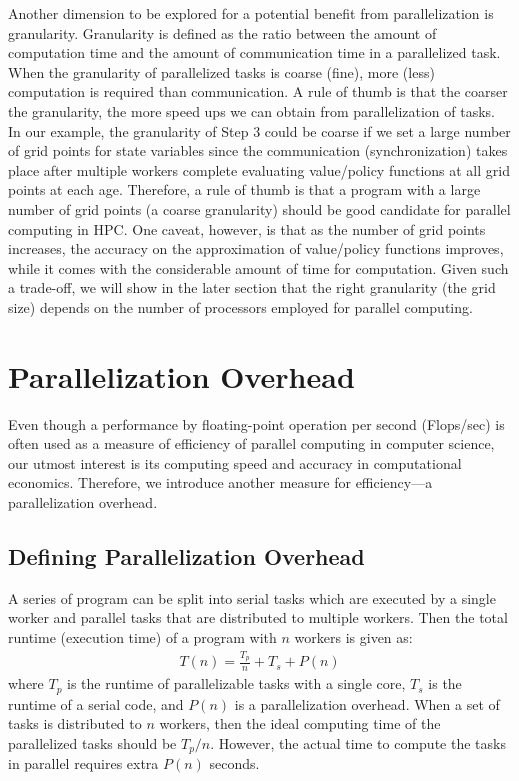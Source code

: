 \documentclass[12pt]{article}
\begin{document}
Another dimension to be explored for a potential benefit from parallelization is granularity. Granularity is defined as the ratio between the amount of computation time and the amount of communication time in a parallelized task. When the granularity of parallelized tasks is coarse (fine), more (less) computation is required than communication. A rule of thumb is that the coarser the granularity, the more speed ups we can obtain from parallelization of tasks. In our example, the granularity of Step 3 could be coarse if we set a large number of grid points for state variables since the communication (synchronization) takes place after multiple workers complete evaluating value/policy functions at all grid points at each age. Therefore, a rule of thumb is that a program with a large number of grid points (a coarse granularity) should be good candidate for parallel computing in HPC. One caveat, however, is that as the number of grid points increases, the accuracy on the approximation of value/policy functions improves, while it comes with the considerable amount of time for computation. Given such a trade-off, we will show in the later section that the right granularity (the grid size) depends on the number of processors employed for parallel computing. 





\section{Parallelization Overhead}
Even though a performance by floating-point operation per second (Flops/sec) is often used as a measure of efficiency of parallel computing in computer science, our utmost interest is its computing speed and accuracy in computational economics. Therefore, we introduce another measure for efficiency---a parallelization overhead. 


\subsection{Defining Parallelization Overhead}
A series of program can be split into serial tasks which are executed by a single worker and parallel tasks that are distributed to multiple workers. Then the total runtime (execution time) of a program with $n$ workers is given as:
\begin{align*}
T(n) = \frac{T_p}{n} + T_s + P(n)
\end{align*}
where $T_p$ is the runtime of parallelizable tasks with a single core, $T_s$ is the runtime of a serial code, and $P(n)$ is a parallelization overhead. When a set of tasks is distributed to $n$ workers, then the ideal computing time of the parallelized tasks should be $T_p/n$. However, the actual time to compute the tasks in parallel requires extra $P(n)$ seconds.
\end{document}
